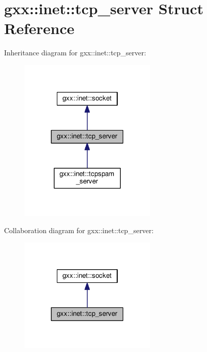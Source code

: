 \hypertarget{structgxx_1_1inet_1_1tcp__server}{}\section{gxx\+:\+:inet\+:\+:tcp\+\_\+server Struct Reference}
\label{structgxx_1_1inet_1_1tcp__server}


Inheritance diagram for gxx\+:\+:inet\+:\+:tcp\+\_\+server\+:
\nopagebreak
\begin{figure}[H]
\begin{center}
\leavevmode
\includegraphics[width=186pt]{structgxx_1_1inet_1_1tcp__server__inherit__graph}
\end{center}
\end{figure}


Collaboration diagram for gxx\+:\+:inet\+:\+:tcp\+\_\+server\+:
\nopagebreak
\begin{figure}[H]
\begin{center}
\leavevmode
\includegraphics[width=186pt]{structgxx_1_1inet_1_1tcp__server__coll__graph}
\end{center}
\end{figure}
